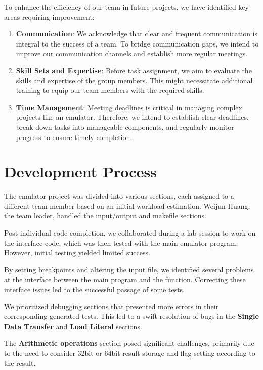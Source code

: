 \documentclass[11pt]{article}
\begin{document}
To enhance the efficiency of our team in future projects, we have identified key areas requiring improvement:

\begin{enumerate}
  \item \textbf{Communication}: We acknowledge that clear and frequent communication is integral to the success of a team. To bridge communication gaps, we intend to improve our communication channels and establish more regular meetings.
  \item \textbf{Skill Sets and Expertise}: Before task assignment, we aim to evaluate the skills and expertise of the group members. This might necessitate additional training to equip our team members with the required skills.
  \item \textbf{Time Management}: Meeting deadlines is critical in managing complex projects like an emulator. Therefore, we intend to establish clear deadlines, break down tasks into manageable components, and regularly monitor progress to ensure timely completion.
\end{enumerate}

\section*{Development Process}

The emulator project was divided into various sections, each assigned to a different team member based on an initial workload estimation. Weijun Huang, the team leader, handled the input/output and makefile sections.

Post individual code completion, we collaborated during a lab session to work on the interface code, which was then tested with the main emulator program. However, initial testing yielded limited success.

By setting breakpoints and altering the input file, we identified several problems at the interface between the main program and the function. Correcting these interface issues led to the successful passage of some tests.

We prioritized debugging sections that presented more errors in their corresponding generated tests. This led to a swift resolution of bugs in the \textbf{Single Data Transfer} and \textbf{Load Literal} sections.

The \textbf{Arithmetic operations} section posed significant challenges, primarily due to the need to consider 32bit or 64bit result storage and flag setting according to the result.
\end{document}
